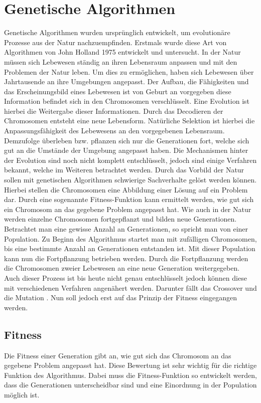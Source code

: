 \section{Genetische Algorithmen}
\label{sec:genetischer_algo}
Genetische Algorithmen wurden ursprünglich entwickelt, um evolutionäre Prozesse aus der Natur nachzuempfinden. Erstmals wurde diese Art von Algorithmen von John Holland 1975 entwickelt und untersucht.
In der Natur müssen sich Lebewesen ständig an ihren Lebensraum anpassen und mit den Problemen der Natur leben. Um dies zu ermöglichen, haben sich Lebewesen über Jahrtausende an ihre Umgebungen angepasst. Der Aufbau, die Fähigkeiten und das Erscheinungsbild eines Lebewesen ist von Geburt an vorgegeben diese Information befindet sich in den Chromosomen verschlüsselt. Eine Evolution ist hierbei die Weitergabe dieser Informationen. Durch das Decodieren der Chromosomen entsteht eine neue Lebensform.
Natürliche Selektion ist hierbei die Anpassungsfähigkeit des Lebewesens an den vorgegebenen Lebensraum. Demzufolge überleben bzw. pflanzen sich nur die Generationen fort, welche sich gut an die Umstände der Umgebung angepasst haben. Die Mechanismen hinter der Evolution sind noch nicht komplett entschlüsselt, jedoch sind einige Verfahren bekannt, welche im Weiteren betrachtet werden.
Durch das Vorbild der Natur sollen mit genetischen Algorithmen schwierige Sachverhalte gelöst werden können. Hierbei stellen die Chromosomen eine Abbildung einer Lösung auf ein Problem dar. Durch eine sogenannte Fitness-Funktion kann ermittelt werden, wie gut sich ein Chromosom an das gegebene Problem angepasst hat. Wie auch in der Natur werden einzelne Chromosomen fortgepflanzt und bilden neue Generationen. Betrachtet man eine gewisse Anzahl an Generationen, so spricht man von einer Population. Zu Beginn des Algorithmus startet man mit zufälligen Chromosomen, bis eine bestimmte Anzahl an Generationen entstanden ist. Mit dieser Population kann nun die Fortpflanzung betrieben werden.
Durch die Fortpflanzung werden die Chromosomen zweier Lebewesen an eine neue Generation weitergegeben. Auch dieser Prozess ist bis heute nicht genau entschlüsselt jedoch können diese mit verschiedenen Verfahren angenähert werden. Darunter fällt das Crossover und die Mutation \cite{davis1991handbook}. Nun soll jedoch erst auf das Prinzip der Fitness eingegangen werden. 

\subsection{Fitness}
Die Fitness einer Generation gibt an, wie gut sich das Chromosom an das gegebene Problem angepasst hat. Diese Bewertung ist sehr wichtig für die richtige Funktion des Algorithmus. Dabei muss die Fitness-Funktion so entwickelt werden, dass die Generationen unterscheidbar sind und eine Einordnung in der Population möglich ist. 

